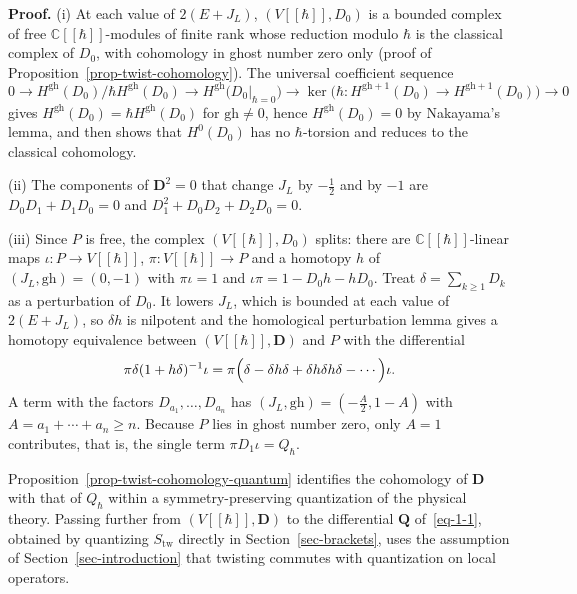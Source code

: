 \documentclass[11pt]{article}
\numberwithin{equation}{section}
\numberwithin{figure}{section}
\numberwithin{table}{section}
\begin{document}
\begin{proofbox}
\textbf{Proof.} (i) At each value of $2(E+J_L)$, $(V[[\hbar]],D_0)$ is a bounded complex of free $\mathbb C[[\hbar]]$-modules of finite rank whose reduction modulo $\hbar$ is the classical complex of $D_0$, with cohomology in ghost number zero only (proof of Proposition~\ref{prop-twist-cohomology}). The universal coefficient sequence
\begin{equation*}
0\to H^{\mathrm{gh}}(D_0)/\hbar H^{\mathrm{gh}}(D_0)\to H^{\mathrm{gh}}\bigl(D_0|_{\hbar=0}\bigr)\to\ker\bigl(\hbar:H^{\mathrm{gh}+1}(D_0)\to H^{\mathrm{gh}+1}(D_0)\bigr)\to0
\end{equation*}
gives $H^{\mathrm{gh}}(D_0)=\hbar H^{\mathrm{gh}}(D_0)$ for $\mathrm{gh}\ne0$, hence $H^{\mathrm{gh}}(D_0)=0$ by Nakayama's lemma, and then shows that $H^0(D_0)$ has no $\hbar$-torsion and reduces to the classical cohomology.

(ii) The components of $\mathbf D^2=0$ that change $J_L$ by $-\tfrac12$ and by $-1$ are $D_0D_1+D_1D_0=0$ and $D_1^2+D_0D_2+D_2D_0=0$.

(iii) Since $P$ is free, the complex $(V[[\hbar]],D_0)$ splits: there are $\mathbb C[[\hbar]]$-linear maps $\iota:P\to V[[\hbar]]$, $\pi:V[[\hbar]]\to P$ and a homotopy $h$ of $(J_L,\mathrm{gh})=(0,-1)$ with $\pi\iota=1$ and $\iota\pi=1-D_0h-hD_0$. Treat $\delta=\sum_{k\ge1}D_k$ as a perturbation of $D_0$. It lowers $J_L$, which is bounded at each value of $2(E+J_L)$, so $\delta h$ is nilpotent and the homological perturbation lemma \cite[Lemma 2.4]{Crainic} gives a homotopy equivalence between $(V[[\hbar]],\mathbf D)$ and $P$ with the differential
\begin{equation*}
\pi\delta(1+h\delta)^{-1}\iota=\pi\Bigl(\delta-\delta h\delta+\delta h\delta h\delta-\cdots\Bigr)\iota .
\end{equation*}
A term with the factors $D_{a_1},\ldots,D_{a_n}$ has $(J_L,\mathrm{gh})=(-\tfrac A2,1-A)$ with $A=a_1+\cdots+a_n\ge n$. Because $P$ lies in ghost number zero, only $A=1$ contributes, that is, the single term $\pi D_1\iota=Q_\hbar$.~\hfill\qedsymbol
\end{proofbox}

Proposition~\ref{prop-twist-cohomology-quantum} identifies the cohomology of $\mathbf D$ with that of $Q_\hbar$ within a symmetry-preserving quantization of the physical theory. Passing further from $(V[[\hbar]],\mathbf D)$ to the differential $\mathbf Q$ of~\eqref{eq-1-1}, obtained by quantizing $S_{\mathrm{tw}}$ directly in Section~\ref{sec-brackets}, uses the assumption of Section~\ref{sec-introduction} that twisting commutes with quantization on local operators.
\end{document}
